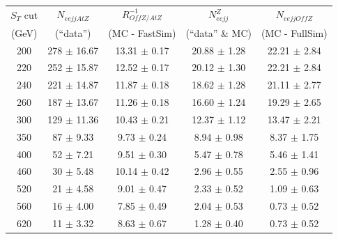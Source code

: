 %
%

\begin{table}[htbp]
\begin{center}
\begin{tabular}{||c||c|c|c||c||}
\hline\hline
$S_{T}$ cut  &  $N_{eejjAtZ}$  &   $R_{OffZ/AtZ}^{-1}$  &     $N_{eejj}^{Z}$  &   $N_{eejjOffZ}$  \\ 
 (GeV)       &     (``data'')  &        (MC - FastSim)  &   (``data'' \& MC)  &   (MC - FullSim)  \\ 
\hline\hline
   200  &     278  $\pm$   16.67  &   13.31  $\pm$    0.17  &   20.88  $\pm$    1.28  &   22.21  $\pm$    2.84  \\ 
   220  &     252  $\pm$   15.87  &   12.52  $\pm$    0.17  &   20.12  $\pm$    1.30  &   22.21  $\pm$    2.84  \\ 
   240  &     221  $\pm$   14.87  &   11.87  $\pm$    0.18  &   18.62  $\pm$    1.28  &   21.11  $\pm$    2.77  \\ 
   260  &     187  $\pm$   13.67  &   11.26  $\pm$    0.18  &   16.60  $\pm$    1.24  &   19.29  $\pm$    2.65  \\ 
   300  &     129  $\pm$   11.36  &   10.43  $\pm$    0.21  &   12.37  $\pm$    1.12  &   13.47  $\pm$    2.21  \\ 
   350  &      87  $\pm$    9.33  &    9.73  $\pm$    0.24  &    8.94  $\pm$    0.98  &    8.37  $\pm$    1.75  \\ 
   400  &      52  $\pm$    7.21  &    9.51  $\pm$    0.30  &    5.47  $\pm$    0.78  &    5.46  $\pm$    1.41  \\ 
   460  &      30  $\pm$    5.48  &   10.14  $\pm$    0.42  &    2.96  $\pm$    0.55  &    2.55  $\pm$    0.96  \\ 
   520  &      21  $\pm$    4.58  &    9.01  $\pm$    0.47  &    2.33  $\pm$    0.52  &    1.09  $\pm$    0.63  \\ 
   560  &      16  $\pm$    4.00  &    7.85  $\pm$    0.49  &    2.04  $\pm$    0.53  &    0.73  $\pm$    0.52  \\ 
   620  &      11  $\pm$    3.32  &    8.63  $\pm$    0.67  &    1.28  $\pm$    0.40  &    0.73  $\pm$    0.52  \\ 

\end{tabular}
\end{center}
\end{table}
